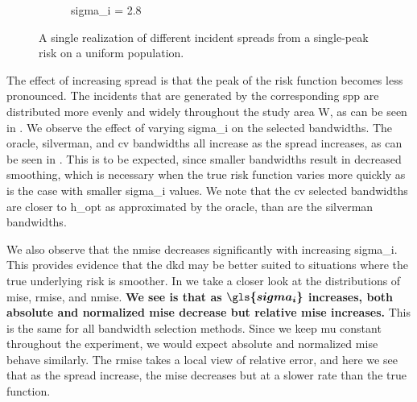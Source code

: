 \begin{figure}[htbp]
\begin{subfigure}{0.45\textwidth}
        \caption{\gls{sigma_i} = 2.8}
    \end{subfigure}
    \caption[Examples showing incident spread]
        {A single realization of different incident \glspl{spread} from a single-peak risk on a uniform population. \scatterplotcaption}
    \label{fig:one_sample:unif_Spreads_1h}
\end{figure}

The effect of increasing \gls{spread} is that the peak of the risk function becomes less pronounced.
The incidents that are generated by the corresponding \gls{spp} are distributed more evenly and widely throughout the study area \gls{W},
as can be seen in .
We observe the effect of varying \gls{sigma_i} on the selected bandwidths.
The \gls{oracle}, \gls{silverman}, and \gls{cv} bandwidths all increase as the spread increases, as can be seen in .
This is to be expected, since smaller bandwidths result in decreased smoothing,
which is necessary when the true risk function varies more quickly as is the case with smaller \gls{sigma_i} values.
We note that the \gls{cv} selected bandwidths are closer to \gls{h_opt} as approximated by the \gls{oracle}, than are the \gls{silverman} bandwidths.



We also observe that the \gls{nmise} decreases significantly with increasing \gls{sigma_i}.
This provides evidence that the \gls{dkd} may be better suited to situations where the true underlying risk is smoother.
In  we take a closer look at the distributions of \gls{mise}, \gls{rmise}, and \gls{nmise}.
\textbf{We see is that as $\boldsymbol{\gls{sigma_i}}$ increases, both absolute and normalized \gls{mise} decrease but relative \gls{mise} increases.}
This is the same for all bandwidth selection methods.
Since we keep \gls{mu} constant throughout the experiment, we would expect absolute and normalized \gls{mise} behave similarly.
The \gls{rmise} takes a local view of relative error, and here we see that as the \gls{spread} increase, the \gls{mise} decreases but at a slower rate than the true function.


